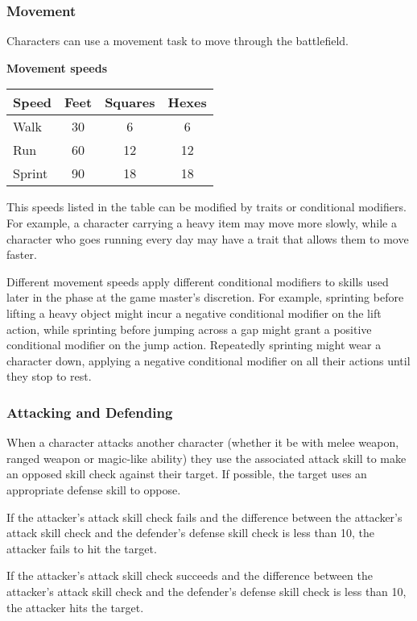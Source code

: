\documentclass[11pt]{article}
\begin{document}
\subsubsection{Movement}
Characters can use a movement task to move through the battlefield.

\begin{center}
	\textbf{Movement speeds} \\
	\begin{tabular}{lccc}
		Speed  & Feet & Squares & Hexes \\
		\hline
		Walk   & 30   & 6       & 6     \\
		Run    & 60   & 12      & 12    \\
		Sprint & 90   & 18      & 18    \\
	\end{tabular}
\end{center}

This speeds listed in the table can be modified by traits or conditional modifiers.
For example, a character carrying a heavy item may move more slowly, while a character who goes running every day may have a trait that allows them to move faster.

Different movement speeds apply different conditional modifiers to skills used later in the phase at the game master's discretion.
For example, sprinting before lifting a heavy object might incur a negative conditional modifier on the lift action, while sprinting before jumping across a gap might grant a positive conditional modifier on the jump action.
Repeatedly sprinting might wear a character down, applying a negative conditional modifier on all their actions until they stop to rest.

\subsubsection{Attacking and Defending}
When a character attacks another character (whether it be with melee weapon, ranged weapon or magic-like ability) they use the associated attack skill to make an opposed skill check against their target.
If possible, the target uses an appropriate defense skill to oppose.

If the attacker's attack skill check fails and the difference between the attacker's attack skill check and the defender's defense skill check is less than 10, the attacker fails to hit the target.

If the attacker's attack skill check succeeds and the difference between the attacker's attack skill check and the defender's defense skill check is less than 10, the attacker hits the target.
\end{document}
